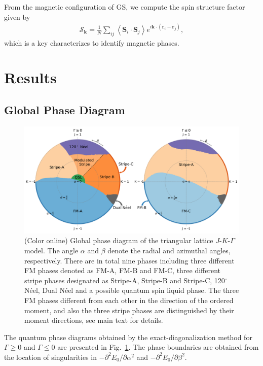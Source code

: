 \documentclass[aps,prb,reprint,amsfonts,amsmath,amssymb,showpacs,groupedaddress,superscriptaddress]{revtex4-1}
\begin{document}
From the magnetic configuration of GS, we compute the spin structure factor given by
\begin{align}
    \mathcal{S}_{\bm{k}} = \frac{1}{N} \sum_{ij} \left \langle \bm{S}_i \cdot \bm{S}_j \right \rangle e^{i \bm{k} \cdot (\bm{r}_i-\bm{r}_j)},
\end{align}
which is a key characterizes to identify magnetic phases.

\section{\label{sec:Results}Results}

\subsection{\label{subsec:GlobalPhaseDiagram}Global Phase Diagram}

\begin{figure}
    \centering
    \includegraphics[width=\textwidth]{fig/QuantumGlobalPhaseDiagram.pdf}
    \caption{\label{fig:QuantumPhaseDiagram}(Color online) Global phase diagram of the triangular lattice $J$-$K$-$\Gamma$ model. The angle $\alpha$ and $\beta$ denote the radial and azimuthal angles, respectively. There are in total nine phases including three different FM phases denoted as FM-A, FM-B and FM-C, three different stripe phases designated as Stripe-A, Stripe-B and Stripe-C, 120$^\circ$ N\'{e}el, Dual N\'{e}el and a possible quantum spin liquid phase. The three FM phases different from each other in the direction of the ordered moment, and also the three stripe phases are distinguished by their moment directions, see main text for details.}
\end{figure}

The quantum phase diagrams obtained by the exact-diagonalization method for $\Gamma \geq 0$ and $\Gamma \leq 0$ are presented in Fig.~\ref{fig:QuantumPhaseDiagram}. The phase boundaries are obtained from the location of singularities in $-\partial^2E_0/\partial\alpha^2$ and $-\partial^2E_0/\partial\beta^2$.
\end{document}
